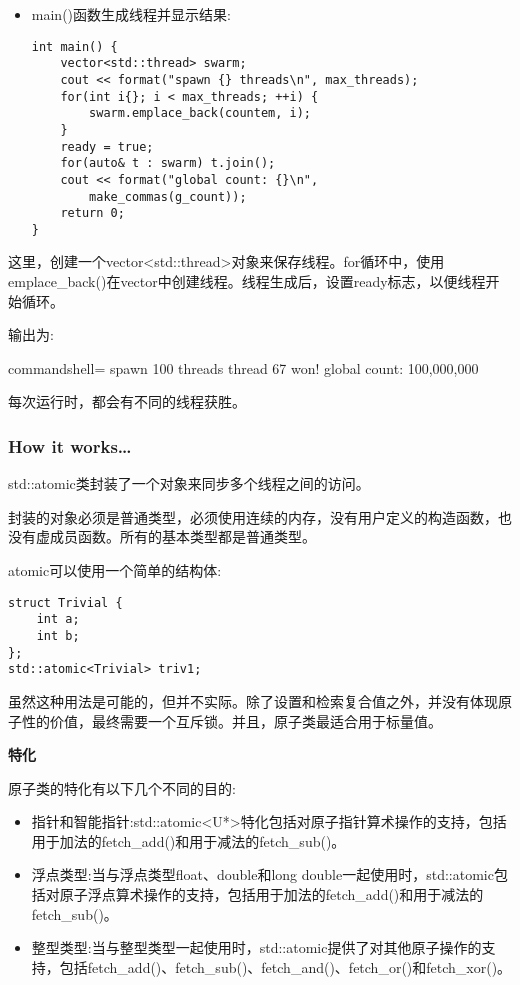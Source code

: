 \begin{itemize}
\item 
main()函数生成线程并显示结果:

\begin{lstlisting}[style=styleCXX]
int main() {
	vector<std::thread> swarm;
	cout << format("spawn {} threads\n", max_threads);
	for(int i{}; i < max_threads; ++i) {
		swarm.emplace_back(countem, i);
	}
	ready = true;
	for(auto& t : swarm) t.join();
	cout << format("global count: {}\n",
		make_commas(g_count));
	return 0;
}
\end{lstlisting}

\end{itemize}

这里，创建一个vector<std::thread>对象来保存线程。for循环中，使用emplace\_back()在vector中创建线程。线程生成后，设置ready标志，以便线程开始循环。

输出为:

\begin{tcblisting}{commandshell={}}
spawn 100 threads
thread 67 won!
global count: 100,000,000
\end{tcblisting}

每次运行时，都会有不同的线程获胜。

\subsubsection{How it works…}

std::atomic类封装了一个对象来同步多个线程之间的访问。

封装的对象必须是普通类型，必须使用连续的内存，没有用户定义的构造函数，也没有虚成员函数。所有的基本类型都是普通类型。

atomic可以使用一个简单的结构体:

\begin{lstlisting}[style=styleCXX]
struct Trivial {
	int a;
	int b;
};
std::atomic<Trivial> triv1;
\end{lstlisting}

虽然这种用法是可能的，但并不实际。除了设置和检索复合值之外，并没有体现原子性的价值，最终需要一个互斥锁。并且，原子类最适合用于标量值。

\noindent
\textbf{特化}

原子类的特化有以下几个不同的目的:

\begin{itemize}
\item 
指针和智能指针:std::atomic<U*>特化包括对原子指针算术操作的支持，包括用于加法的fetch\_add()和用于减法的fetch\_sub()。

\item 
浮点类型:当与浮点类型float、double和long double一起使用时，std::atomic包括对原子浮点算术操作的支持，包括用于加法的fetch\_add()和用于减法的fetch\_sub()。

\item 
整型类型:当与整型类型一起使用时，std::atomic提供了对其他原子操作的支持，包括fetch\_add()、fetch\_sub()、fetch\_and()、fetch\_or()和fetch\_xor()。

\end{itemize}


